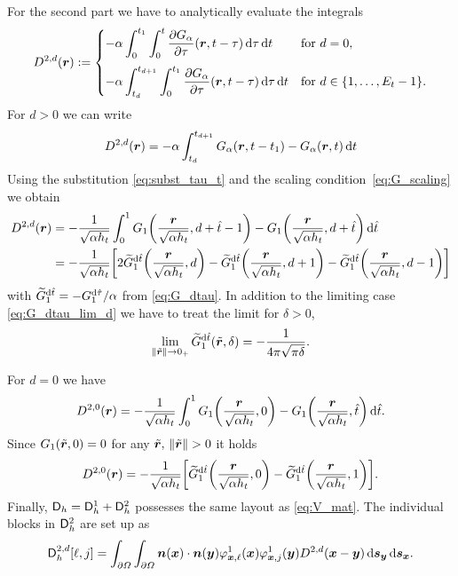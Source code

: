 \documentclass[a4paper,11pt]{article}
\begin{document}
For the second part we have to analytically evaluate the integrals
\begin{equation*}
  D^{2,d}({{\bm{r}}}) := 
  \begin{cases}
  \displaystyle
    -\alpha \int_{0}^{t_1} \int_{0}^{t} \frac{\partial G_\alpha}{\partial \tau}({{\bm{r}}},t-\tau) \,{\mathrm{d}}\tau \,{\mathrm{d}} t & \text{for } d = 0, \\[4mm]
  \displaystyle
    -\alpha \int_{t_d}^{t_{d+1}} \int_{0}^{t_1} \frac{\partial G_\alpha}{\partial \tau}({{\bm{r}}},t-\tau) \,{\mathrm{d}}\tau \,{\mathrm{d}} t & \text{for } d \in \{1,\ldots,E_t-1\}.
  \end{cases}
\end{equation*}
For $d>0$ we can write
\begin{equation*}
  D^{2,d}({{\bm{r}}}) = -\alpha \int_{t_d}^{t_{d+1}} G_\alpha({{\bm{r}}},t-t_1) - G_\alpha({{\bm{r}}},t) \,{\mathrm{d}} t
\end{equation*}
Using the substitution \eqref{eq:subst_tau_t} and the scaling condition~\eqref{eq:G_scaling} we obtain
\begin{align*}
  D^{2,d}({{\bm{r}}}) &= -\frac{1}{\sqrt{\alpha h_t}} \int_0^1 G_1\bigg(\frac{{{\bm{r}}}}{\sqrt{\alpha h_t}},d+\hat t-1\bigg) - G_1\bigg(\frac{{{\bm{r}}}}{\sqrt{\alpha h_t}},d + \hat t\bigg) \,{\mathrm{d}} \hat t \\
  &= -\frac{1}{\sqrt{\alpha h_t}} \bigg[ 2\widetilde G_1^{{\mathrm{d}}\hat t}\bigg( \frac{{{\bm{r}}}}{\sqrt{\alpha h_t}}, d \bigg) - \widetilde G_1^{{\mathrm{d}}\hat t}\bigg( \frac{{{\bm{r}}}}{\sqrt{\alpha h_t}}, d + 1 \bigg) - \widetilde G_1^{{\mathrm{d}}\hat t}\bigg( \frac{{{\bm{r}}}}{\sqrt{\alpha h_t}}, d - 1 \bigg) \bigg]
\end{align*}
with $\widetilde G_1^{{\mathrm{d}}\hat t} = -G_1^{{\mathrm{d}}\hat \tau}/\alpha$ from \eqref{eq:G_dtau}. In addition to the limiting case \eqref{eq:G_dtau_lim_d} we have to treat the limit for $\delta>0$,
\begin{equation*}
  \lim_{\|\tilde {{{\bm{r}}}}\| \to 0_+} \widetilde G^{{\mathrm{d}}\hat t}_1(\tilde {{{\bm{r}}}},\delta) = -\frac{1}{4\pi\sqrt{\pi\delta}}.
\end{equation*}

For $d=0$ we have
\begin{equation*}
  D^{2,0}({{\bm{r}}}) = -\frac{1}{\sqrt{\alpha h_t}} \int_0^1 G_1\bigg(\frac{{{\bm{r}}}}{\sqrt{\alpha h_t}},0\bigg) - G_1\bigg(\frac{{{\bm{r}}}}{\sqrt{\alpha h_t}},\hat t\bigg) \,{\mathrm{d}} \hat t.
\end{equation*}
Since $G_1(\tilde {{{\bm{r}}}},0) = 0$ for any $\tilde \vr,\,\|\tilde \vr\|>0$ it holds
\begin{equation*}
  D^{2,0}({{\bm{r}}}) = -\frac{1}{\sqrt{\alpha h_t}} \bigg[ \widetilde G_1^{{\mathrm{d}}\hat t}\bigg( \frac{{{\bm{r}}}}{\sqrt{\alpha h_t}}, 0 \bigg) - \widetilde G_1^{{\mathrm{d}}\hat t}\bigg( \frac{{{\bm{r}}}}{\sqrt{\alpha h_t}}, 1 \bigg) \bigg].
\end{equation*}
Finally, ${{\mathsf{D}}}_h = {{\mathsf{D}}}_h^1 + {{\mathsf{D}}}_h^2$ possesses the same layout as \eqref{eq:V_mat}. The individual blocks in ${{\mathsf{D}}}_h^2$ are set up as
\begin{equation*}
  {\ensuremath{{\mathsf{D}}}}^{2,d}_h[ \ell , j ] = \int_{\partial\Omega} \int_{\partial\Omega} {{\bm{n}}}({{\bm{x}}}) \cdot {\ensuremath{{\bm{n}}}}({{\bm{y}}}) \varphi^1_{{{\bm{x}}},\ell}({{\bm{x}}}) \varphi^1_{{{\bm{x}}},j}({{\bm{y}}}) D^{2,d}({{\bm{x}}}-{{\bm{y}}}) \,{\mathrm{d}}{{\bm{s}}}_{{\bm{y}}} \,{\mathrm{d}}{{\bm{s}}}_{{\bm{x}}}.
\end{equation*}
\end{document}
